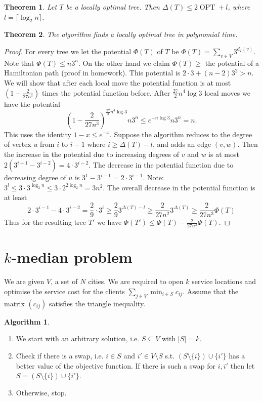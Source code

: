 \documentclass{article}
\newtheorem*{thm}{Theorem}
\theoremstyle{definition}
\newtheorem*{alg}{Algorithm}
\DeclareMathOperator{\OPT}{OPT}
\begin{document}
\begin{thm}
Let $T$ be a locally optimal tree.
Then $\Delta(T)\le 2\OPT + l$, where $l=\lceil \log_2n \rceil$.
\end{thm}

\begin{thm}
The algorithm finds a locally optimal tree in polynomial time.
\end{thm}

\begin{proof}
For every tree we let the potential $\Phi(T)$ of $T$ be $\Phi(T) = \sum_{v\in V} 3^{d_T(v)}$. \\
Note that $\Phi(T) \le n3^n$.
On the other hand we claim $\Phi(T) \ge$ the potential of a Hamiltonian path (proof in homework).
This potential is $2\cdot3 + (n-2)3^2> n$.
We will show that after each local move the potential function is at most $(1-\frac{2}{27n^3})$ times the potential function before.
After $\frac{27}{2}n^4\log3$ local moves we have the potential $$\left(1-\frac{2}{27n^3}\right)^{\frac{27}{2}n^4\log 3} n3^n \le e^{-n\log 3}n3^n = n.$$
This uses the identity $1-x \le e^{-x}$.
Suppose the algorithm reduces to the degree of vertex $u$ from $i$ to $i-1$ where $i\ge \Delta(T) - l$, and adds an edge $(v,w)$.
Then the increase in the potential due to increasing degrees of $v$ and $w$ is at most $2(3^{i-1} -3^{i-2}) = 4\cdot3^{i-2}$.
The decrease in the potential function due to decreasing degree of $u$ is $3^1 - 3^{i-1} = 2\cdot3^{i-1}$.
Note: $3^l \le 3\cdot 3^{\log_2 n}\le 3\cdot2^{2\log_2 n} = 3n^2$.
The overall decrease in the potential function is at least $$2\cdot 3^{i-1}-4\cdot 3^{i-2} = \frac{2}{9}\cdot 3^i\ge \frac{2}{9}3^{\Delta(T) - l}\ge \frac{2}{27n^2}3^{\Delta(T)} \ge \frac{2}{27n^3}\Phi(T)$$
Thus for the resulting tree $T'$ we have $\Phi(T') \le \Phi(T) - \frac{2}{27n^3}\Phi(T)$.
\end{proof}

\section{$k$-median problem}
We are given $V$, a set of $N$ cities.
We are required to open $k$ service locations and optimise the service cost for the clients $\sum_{j\in V} \min_{i\in S} c_{ij}$.
Assume that the matrix $(c_{ij})$ satisfies the triangle inequality.


\begin{alg}~\\
\begin{enumerate}
\item We start with an arbitrary solution, i.e. $S\subseteq V$ with $|S| = k$.
\item Check if there is a swap, i.e. $i\in S$ and $i'\in V\setminus S$ s.t. $(S\setminus\{i\})\cup\{i'\}$ has a better value of the objective function.
If there is such a swap for $i,i'$ then let $S=(S\setminus\{i\})\cup\{i'\}$.
\item Otherwise, stop.
\end{enumerate}
\end{alg}
\end{document}
